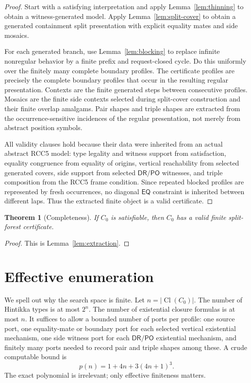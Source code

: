 \documentclass[11pt]{article}
\newtheorem{theorem}{Theorem}[section]
\newcommand{\Cl}{\operatorname{Cl}}
\newcommand{\EQ}{\mathsf{EQ}}
\newcommand{\PO}{\mathsf{PO}}
\newcommand{\DR}{\mathsf{DR}}
\begin{document}
\begin{proof}
Start with a satisfying interpretation and apply Lemma~\ref{lem:thinning} to obtain a witness-generated model.  Apply Lemma~\ref{lem:split-cover} to obtain a generated containment split presentation with explicit equality mates and side mosaics.

For each generated branch, use Lemma~\ref{lem:blocking} to replace infinite nonregular behavior by a finite prefix and request-closed cycle.  Do this uniformly over the finitely many complete boundary profiles.  The certificate profiles are precisely the complete boundary profiles that occur in the resulting regular presentation.  Contexts are the finite generated steps between consecutive profiles.  Mosaics are the finite side contexts selected during split-cover construction and their finite overlap amalgams.  Pair shapes and triple shapes are extracted from the occurrence-sensitive incidences of the regular presentation, not merely from abstract position symbols.

All validity clauses hold because their data were inherited from an actual abstract RCC5 model: type legality and witness support from satisfaction, equality congruence from equality of origins, vertical reachability from selected generated covers, side support from selected \(\DR/\PO\) witnesses, and triple composition from the RCC5 frame condition.  Since repeated blocked profiles are represented by fresh occurrences, no diagonal \(\EQ\) constraint is inherited between different laps.  Thus the extracted finite object is a valid certificate.
\end{proof}

\begin{theorem}[Completeness]
If \(C_0\) is satisfiable, then \(C_0\) has a valid finite split-forest certificate.
\end{theorem}

\begin{proof}
This is Lemma~\ref{lem:extraction}.
\end{proof}

\section{Effective enumeration}

We spell out why the search space is finite.  Let \(n=|\Cl(C_0)|\).  The number of Hintikka types is at most \(2^n\).  The number of existential closure formulas is at most \(n\).  It suffices to allow a bounded number of ports per profile: one source port, one equality-mate or boundary port for each selected vertical existential mechanism, one side witness port for each \(\DR/\PO\) existential mechanism, and finitely many ports needed to record pair and triple shapes among these.  A crude computable bound is
\[
  p(n)=1+4n+3(4n+1)^3.
\]
The exact polynomial is irrelevant; only effective finiteness matters.
\end{document}
